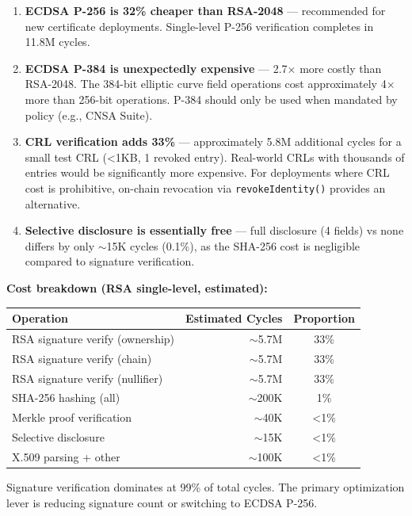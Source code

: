 \documentclass[11pt, a4paper]{article}
\begin{document}
\begin{enumerate}
\def\labelenumi{\arabic{enumi}.}
\item
  \textbf{ECDSA P-256 is 32\% cheaper than RSA-2048} --- recommended for
  new certificate deployments. Single-level P-256 verification completes
  in 11.8M cycles.
\item
  \textbf{ECDSA P-384 is unexpectedly expensive} --- 2.7× more costly
  than RSA-2048. The 384-bit elliptic curve field operations cost
  approximately 4× more than 256-bit operations. P-384 should only be
  used when mandated by policy (e.g., CNSA Suite).
\item
  \textbf{CRL verification adds 33\%} --- approximately 5.8M additional
  cycles for a small test CRL (\textless1KB, 1 revoked entry).
  Real-world CRLs with thousands of entries would be significantly more
  expensive. For deployments where CRL cost is prohibitive, on-chain
  revocation via \texttt{revokeIdentity()} provides an alternative.
\item
  \textbf{Selective disclosure is essentially free} --- full disclosure
  (4 fields) vs none differs by only $\sim$15K cycles (0.1\%),
  as the SHA-256 cost is negligible compared to signature verification.
\end{enumerate}

\textbf{Cost breakdown (RSA single-level, estimated):}

\begin{longtable}[]{@{}lrc@{}}
\toprule\noalign{}
Operation & Estimated Cycles & Proportion \\
\midrule\noalign{}
\endhead
\bottomrule\noalign{}
\endlastfoot
RSA signature verify (ownership) & $\sim$5.7M & 33\% \\
RSA signature verify (chain) & $\sim$5.7M & 33\% \\
RSA signature verify (nullifier) & $\sim$5.7M & 33\% \\
SHA-256 hashing (all) & $\sim$200K & 1\% \\
Merkle proof verification & $\sim$40K & \textless1\% \\
Selective disclosure & $\sim$15K & \textless1\% \\
X.509 parsing + other & $\sim$100K & \textless1\% \\
\end{longtable}

Signature verification dominates at 99\% of total cycles. The primary
optimization lever is reducing signature count or switching to ECDSA
P-256.
\end{document}
